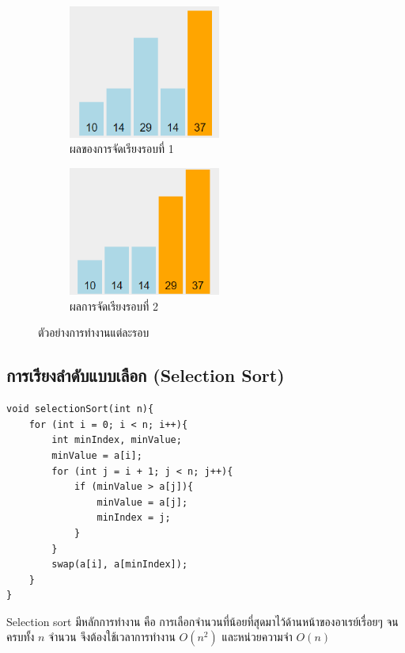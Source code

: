 \begin{figure}[h!]
	\centering
    \begin{subfigure}{.5\textwidth}
    	\centering
        \includegraphics[width=5cm]{images/bubble_sort_round-1}
        \caption{ผลของการจัดเรียงรอบที่ 1}
        \label{fig:bubble_sort_round-1}
    \end{subfigure}%
    \begin{subfigure}{.5\textwidth}
    	\centering
        \includegraphics[width=5cm]{images/bubble_sort_round-2}
        \caption{ผลการจัดเรียงรอบที่ 2}
        \label{fig:bubble_sort_round-2}
    \end{subfigure}
    \caption{ตัวอย่างการทำงานแต่ละรอบ}
    \label{fig:bubble_sort_round-1-2}
\end{figure}

\newpage

\subsection{การเรียงลำดับแบบเลือก (Selection Sort)}

\begin{lstlisting}
void selectionSort(int n){
	for (int i = 0; i < n; i++){
		int minIndex, minValue;
		minValue = a[i];
		for (int j = i + 1; j < n; j++){
			if (minValue > a[j]){
				minValue = a[j];
				minIndex = j;
			}
		}
		swap(a[i], a[minIndex]);
	}
}
\end{lstlisting}

Selection sort มีหลักการทำงาน คือ การเลือกจำนวนที่น้อยที่สุดมาไว้ด้านหน้าของอาเรย์เรื่อยๆ จนครบทั้ง $n$ จำนวน จึงต้องใช้เวลาการทำงาน $O(n^2)$ และหน่วยความจำ $O(n)$

